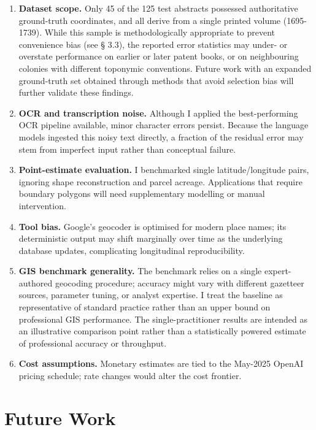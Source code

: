 \begin{enumerate}
\def\labelenumi{\arabic{enumi}.}
\tightlist
\item
  \textbf{Dataset scope.} Only 45 of the 125 test abstracts possessed
  authoritative ground-truth coordinates, and all derive from a single
  printed volume (1695-1739). While this sample is methodologically
  appropriate to prevent convenience bias (see § 3.3), the reported
  error statistics may under- or overstate performance on earlier or
  later patent books, or on neighbouring colonies with different
  toponymic conventions. Future work with an expanded ground-truth set
  obtained through methods that avoid selection bias will further
  validate these findings.
\item
  \textbf{OCR and transcription noise.} Although I applied the
  best-performing OCR pipeline available, minor character errors
  persist. Because the language models ingested this noisy text
  directly, a fraction of the residual error may stem from imperfect
  input rather than conceptual failure.
\item
  \textbf{Point-estimate evaluation.} I benchmarked single
  latitude/longitude pairs, ignoring shape reconstruction and parcel
  acreage. Applications that require boundary polygons will need
  supplementary modelling or manual intervention.
\item
  \textbf{Tool bias.} Google's geocoder is optimised for modern place
  names; its deterministic output may shift marginally over time as the
  underlying database updates, complicating longitudinal
  reproducibility.
\item
  \textbf{GIS benchmark generality.} The benchmark
  \citep{Bashorun2025_gis} relies on a single expert-authored geocoding
  procedure; accuracy might vary with different gazetteer sources,
  parameter tuning, or analyst expertise. I treat the baseline as
  representative of standard practice rather than an upper bound on
  professional GIS performance. The single-practitioner results are
  intended as an illustrative comparison point rather than a
  statistically powered estimate of professional accuracy or throughput.
\item
  \textbf{Cost assumptions.} Monetary estimates are tied to the May-2025
  OpenAI pricing schedule; rate changes would alter the cost frontier.
\end{enumerate}

\section{Future Work}\label{future-work}

